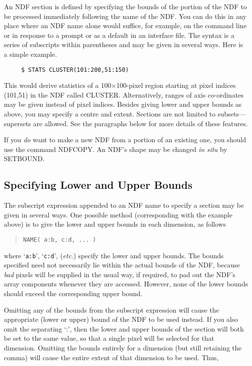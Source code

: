 {An NDF section is defined by specifying the bounds of the portion of
the NDF to be processed immediately following the name of the NDF.
You can do this in any place where an NDF name alone would suffice,
for example, on the command line or in response to a prompt or as a
default in an interface file.  The syntax is a series of subscripts
within parentheses and may be given in several ways. Here is a simple
example. 

\small
\begin{verbatim}
     $ STATS CLUSTER(101:200,51:150)
\end{verbatim}
\normalsize

This would derive statistics of a 100$\times$100-pixel region starting
at pixel indices (101,51) in the NDF called CLUSTER.  Alternatively,
ranges of axis co-ordinates may be given instead of pixel indices.
Besides giving lower and upper bounds as above, you may specify
a centre and extent.  Sections are not limited to subsets---supersets
are allowed.  See the paragraphs below for more details of these
features.

If you {\em do} want to make a new NDF from a portion of an existing one,
you should use the command NDFCOPY.  An NDF's shape may be changed
{\it in situ\/} by SETBOUND.

\subsection{Specifying Lower and Upper Bounds}

The subscript expression appended to an NDF name to specify a section
may be given in several ways. One possible method (corresponding with
the example above) is to give the lower and upper bounds in each
dimension, as follows

\small
\begin{quote}
\begin{center}
{\tt NAME( a:b, c:d, ... )}
\end{center}
\end{quote}
\normalsize

where `{\tt a:b}', `{\tt c:d}', ({\it etc.}) specify the lower and upper
bounds. The bounds specified need not necessarily lie within the actual
bounds of the NDF, because {\em bad\/} pixels will be supplied in the
usual way, if required, to pad out the NDF's array components whenever
they are accessed. However, none of the lower bounds should exceed the
corresponding upper bound. 

Omitting any of the bounds from the subscript expression will cause the
appropriate (lower or upper) bound of the NDF to be used instead. If you
also omit the separating `:', then the lower and upper bounds of the
section will both be set to the same value, so that a single pixel will
be selected for that dimension. Omitting the bounds entirely for a
dimension (but still retaining the comma) will cause the entire extent
of that dimension to be used. Thus, 

}
